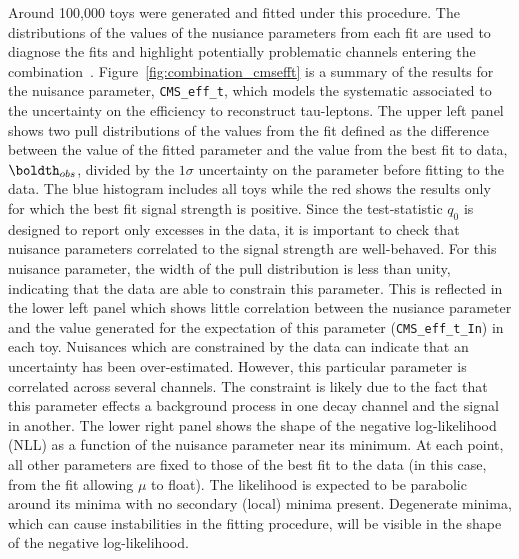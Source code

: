 
Around 100,000 toys were generated and fitted under this procedure. The distributions
of the values of the nusiance parameters from each fit are used to diagnose the fits 
and highlight potentially problematic channels entering the combination~\cite{AN-12-317}.
Figure~\ref{fig:combination_cmsefft} is a summary of the results for the nuisance parameter, \texttt{CMS\_eff\_t}, 
which models the systematic associated to the uncertainty on the efficiency to reconstruct tau-leptons.
The upper left panel shows two pull distributions of the values from the fit defined as the difference between 
the value of the fitted parameter and the value from the best fit to data, $\boldth_{obs}$, 
divided by the $1\sigma$ uncertainty on the parameter before fitting to the data. 
The blue histogram includes all toys while the red shows the results
only for which the best fit signal strength is positive. Since the test-statistic $q_{0}$ is designed 
to report only excesses in the data, it is important to check that nuisance parameters correlated to 
the signal strength are well-behaved.  For this nuisance parameter, the width of the pull distribution is less than unity, indicating
that the data are able to constrain this parameter. This is reflected in the lower left panel 
which shows little correlation between the nusiance parameter and the value generated for the expectation
of this parameter (\texttt{CMS\_eff\_t\_In}) in each toy. Nuisances which are constrained by the data can indicate that an
uncertainty has been over-estimated. However, this particular parameter is correlated across several
channels. The constraint is likely due to the fact that this parameter effects a background process
in one decay channel and the signal in another.
The lower right panel shows the shape of the negative log-likelihood (NLL) as a function of the 
nuisance parameter near its minimum. At each point, all other parameters are fixed 
to those of the best fit to the data (in this case, from the fit allowing $\mu$ to float).
The likelihood is expected to be parabolic around its minima with no secondary (local) minima present.
Degenerate minima, which can cause instabilities in the fitting procedure, will be visible in the 
shape of the negative log-likelihood.
